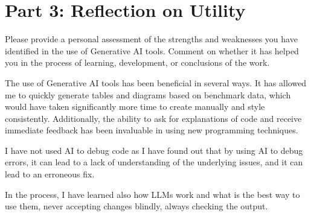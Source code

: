 \section*{Part 3: Reflection on Utility}

Please provide a personal assessment of the strengths and weaknesses you have identified in the use of Generative AI tools. Comment on whether it has helped you in the process of learning, development, or conclusions of the work.

The use of Generative AI tools has been beneficial in several ways. It has allowed me to quickly generate tables and diagrams based on benchmark data, which would have taken significantly more time to create manually and style consistently. Additionally, the ability to ask for explanations of code and receive immediate feedback has been invaluable in using new programming techniques.

I have not used AI to debug code as I have found out that by using AI to debug errors, it can lead to a lack of understanding of the underlying issues, and it can lead to an erroneous fix. 

In the process, I have learned also how LLMs work and what is the best way to use them, never accepting changes blindly, always checking the output.
